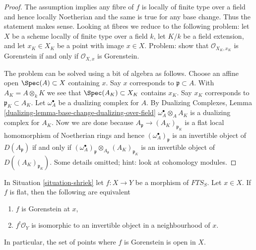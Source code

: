 \begin{proof}
The assumption implies any fibre of $f$ is locally of finite type
over a field and hence locally Noetherian and the same is true for
any base change. Thus the statement makes sense. Looking at
fibres we reduce to the following problem: let $X$ be a scheme
locally of finite type over a field $k$,
let $K/k$ be a field extension, and
let $x_K \in X_K$ be a point with image $x \in X$.
Problem: show that $\mathcal{O}_{X_K, x_K}$ is Gorenstein if and only if
$\mathcal{O}_{X, x}$ is Gorenstein.

\medskip\noindent
The problem can be solved using a bit of algebra as follows.
Choose an affine open $\Spec(A) \subset X$ containing $x$.
Say $x$ corresponds to $\mathfrak p \subset A$.
With $A_K = A \otimes_k K$ we see that $\Spec(A_K) \subset X_K$
contains $x_K$. Say $x_K$ corresponds to $\mathfrak p_K \subset A_K$.
Let $\omega_A^\bullet$ be a dualizing complex for $A$.
By Dualizing Complexes, Lemma
\ref{dualizing-lemma-base-change-dualizing-over-field}
$\omega_A^\bullet \otimes_A A_K$ is a dualizing complex for $A_K$.
Now we are done because
$A_\mathfrak p \to (A_K)_{\mathfrak p_K}$ is a flat local
homomorphism of Noetherian rings and hence
$(\omega_A^\bullet)_\mathfrak p$ is an invertible object
of $D(A_\mathfrak p)$ if and only if
$(\omega_A^\bullet)_\mathfrak p \otimes_{A_\mathfrak p} (A_K)_{\mathfrak p_K}$
is an invertible object of $D((A_K)_{\mathfrak p_K})$.
Some details omitted; hint: look at cohomology modules.
\end{proof}

\begin{lemma}
\label{lemma-affine-flat-Noetherian-gorenstein}
In Situation \ref{situation-shriek} let $f : X \to Y$ be a morphism
of $\textit{FTS}_S$. Let $x \in X$. If $f$ is flat, then
the following are equivalent
\begin{enumerate}
\item $f$ is Gorenstein at $x$,
\item $f^!\mathcal{O}_Y$ is isomorphic to an invertible object
in a neighbourhood of $x$.
\end{enumerate}
In particular, the set of points where $f$ is Gorenstein is
open in $X$.
\end{lemma}

